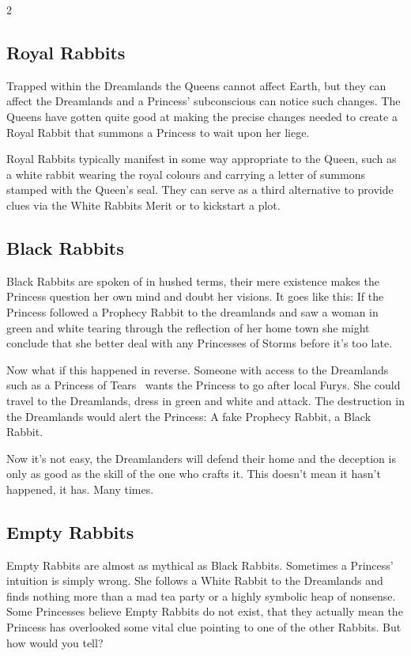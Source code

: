 \begin{multicols}{2}
\subsection*{Royal Rabbits}

Trapped within the Dreamlands the Queens cannot affect Earth, but they can affect the Dreamlands and a Princess' subconscious can notice such changes. The Queens have gotten quite good at making the precise changes needed to create a Royal Rabbit that summons a Princess to wait upon her liege.

Royal Rabbits typically manifest in some way appropriate to the Queen, such as a white rabbit wearing the royal colours and carrying a letter of summons stamped with the Queen's seal. They can serve as a third alternative to provide clues via the White Rabbits Merit or to kickstart a plot. 

\subsection*{Black Rabbits}

Black Rabbits are spoken of in hushed terms, their mere existence makes the Princess question her own mind and doubt her visions. It goes like this: If the Princess followed a Prophecy Rabbit to the dreamlands and saw a woman in green and white tearing through the reflection of her home town she might conclude that she better deal with any Princesses of Storms before it's too late.

Now what if this happened in reverse. Someone with access to the Dreamlands \textendash\, such as a Princess of Tears \textendash\, wants the Princess to go after local Furys. She could travel to the Dreamlands, dress in green and white and attack. The destruction in the Dreamlands would alert the Princess: A fake Prophecy Rabbit, a Black Rabbit.

Now it's not easy, the Dreamlanders will defend their home and the deception is only as good as the skill of the one who crafts it. This doesn't mean it hasn't happened, it has. Many times.

\subsection*{Empty Rabbits}

Empty Rabbits are almost as mythical as Black Rabbits. Sometimes a Princess' intuition is simply wrong. She follows a White Rabbit to the Dreamlands and finds nothing more than a mad tea party or a highly symbolic heap of nonsense. Some Princesses believe Empty Rabbits do not exist, that they actually mean the Princess has overlooked some vital clue pointing to one of the other Rabbits. But how would you tell?


\end{multicols}
